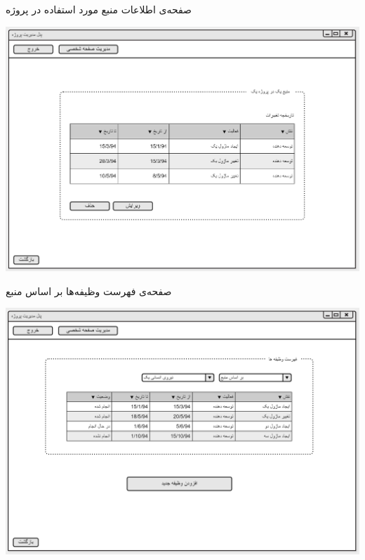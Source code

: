 \documentclass{article}
\begin{document}
\vspace{1cm}
صفحه‌ی اطلاعات منبع مورد استفاده در پروژه 
\begin{center}
\includegraphics[width=\textwidth]{Prototype/ProjectManager/ResourceInformation.png}
\end{center}

\newpage
\vspace{1cm}
صفحه‌ی فهرست وظیفه‌ها بر اساس منبع
\begin{center}
\includegraphics[width=\textwidth]{Prototype/ProjectManager/ProjectTasks1.png}
\end{center}
\end{document}
